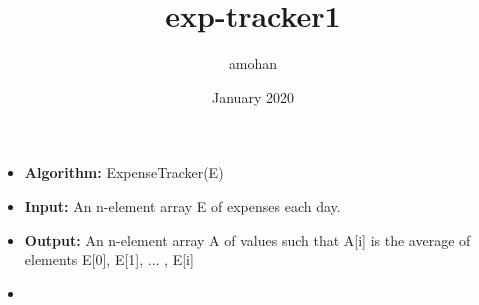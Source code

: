 \documentclass{article}
\title{exp-tracker1}
\author{amohan }
\date{January 2020}
\begin{document}
\begin{itemize}
\item[]
\textbf{Algorithm:} ExpenseTracker(E)
\item[]
\textbf{Input:} An n-element array E of expenses each day.
\item[]
\textbf{Output:} An n-element array A of values such that 
A[i] is the average of elements E[0], E[1], ... , E[i]
\item[]
\end{itemize}
\end{document}
